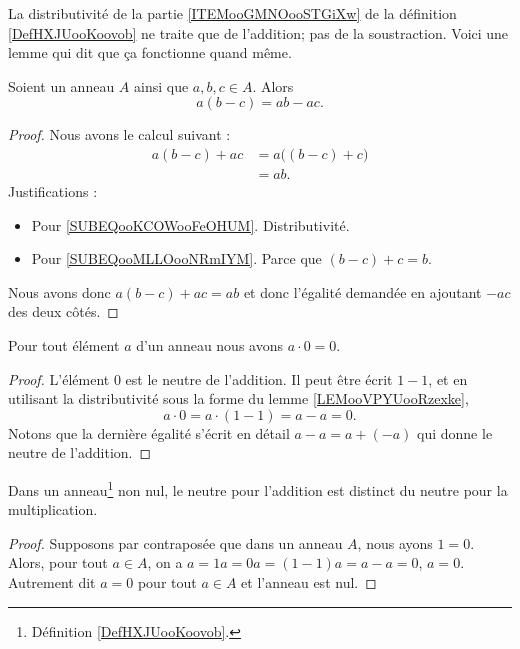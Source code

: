 La distributivité de la partie \ref{ITEMooGMNOooSTGiXw} de la définition \ref{DefHXJUooKoovob} ne traite que de l'addition; pas de la soustraction. Voici une lemme qui dit que ça fonctionne quand même.
\begin{lemma}     \label{LEMooVPYUooRzexke}
	Soient un anneau \( A\) ainsi que \( a,b,c\in A\). Alors
	\begin{equation}
		a(b-c)=ab-ac.
	\end{equation}
\end{lemma}

\begin{proof}
	Nous avons le calcul suivant :
	\begin{subequations}
		\begin{align}
			a(b-c)+ac & =a\big( (b-c)+c \big)     \label{SUBEQooKCOWooFeOHUM} \\
			          & =ab.       \label{SUBEQooMLLOooNRmIYM}
		\end{align}
	\end{subequations}
	Justifications :
	\begin{itemize}
		\item Pour \ref{SUBEQooKCOWooFeOHUM}. Distributivité.
		\item Pour \ref{SUBEQooMLLOooNRmIYM}. Parce que \( (b-c)+c=b\).
	\end{itemize}
	Nous avons donc \( a(b-c)+ac=ab\) et donc l'égalité demandée en ajoutant \( -ac\) des deux côtés.
\end{proof}

\begin{lemma}       \label{LEMooVUSMooWisQpD}
	Pour tout élément \( a\) d'un anneau nous avons \( a\cdot 0=0\).
\end{lemma}

\begin{proof}
	L'élément \( 0\) est le neutre de l'addition. Il peut être écrit \( 1-1\), et en utilisant la distributivité sous la forme du lemme \ref{LEMooVPYUooRzexke},
	\begin{equation}
		a\cdot 0=a\cdot (1-1)=a-a=0.
	\end{equation}
	Notons que la dernière égalité s'écrit en détail \( a-a=a+(-a)\) qui donne le neutre de l'addition.
\end{proof}

\begin{proposition}     \label{PROPooNCCGooXjVyVt}
	Dans un anneau\footnote{Définition \ref{DefHXJUooKoovob}.} non nul, le neutre pour l'addition est distinct du neutre pour la multiplication.
\end{proposition}
\begin{proof}
	Supposons par contraposée que dans un anneau \( A\), nous ayons \( 1 = 0 \). Alors, pour tout \( a \in A \), on a \( a = 1a = 0a = (1 - 1)a = a - a=0 \), \( a = 0\). Autrement dit \( a=0\) pour tout \( a\in A\) et l'anneau est nul.
\end{proof}

